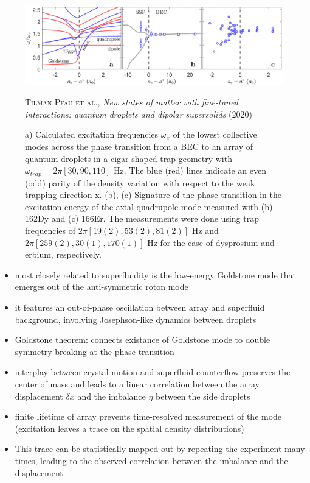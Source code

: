 \begin{figure}[H]
    \centering
    \includegraphics[width=1.0\textwidth]{IMAGE/collective_modes.png}\\
    \caption{
        a) Calculated excitation frequencies $\omega_{x}$ of the lowest collective modes across the phase transition from
           a BEC to an array of quantum droplets in
           a cigar-shaped trap geometry with $\omega_{trap} = 2\pi [30, 90, 110]$ Hz.
           The blue (red) lines
           indicate an even (odd) parity of the density variation with respect to the weak
           trapping direction x.
        (b), (c) Signature of the phase transition in the excitation
        energy of the axial quadrupole mode measured with (b) 162Dy and (c) 166Er.
        The measurements were done using trap frequencies of $2 \pi [19(2), 53(2), 81(2)]$ Hz
        and $2 \pi [259(2), 30(1), 170(1)]$ Hz for the case of dysprosium and erbium, respectively.
      }
    \textsc{Tilman Pfau et al.}, \emph{New states of matter with fine-tuned interactions:
        quantum droplets and dipolar supersolids} (2020)
    \label{fig:collective_modes}
\end{figure}

\begin{itemize}
    \item most closely related to superfluidity is the low-energy Goldstone mode that emerges out of the
        anti-symmetric roton mode
    \item it features an out-of-phase oscillation between array and superfluid background,
        involving Josephson-like dynamics between droplets
    \item Goldstone theorem: connects existance of Goldstone mode to double symmetry breaking at the phase transition
    \item interplay between crystal motion and superfluid counterflow preserves the center of mass and leads
        to a linear correlation between the array displacement $\delta x$ and the imbalance $\eta$ between the side droplets
    \item finite lifetime of array prevents time-resolved measurement of the mode
        (excitation leaves a trace on the spatial density distributions)
    \item This trace can be statistically mapped out by repeating the experiment many times,
        leading to the observed correlation between the imbalance and the displacement
\end{itemize}


